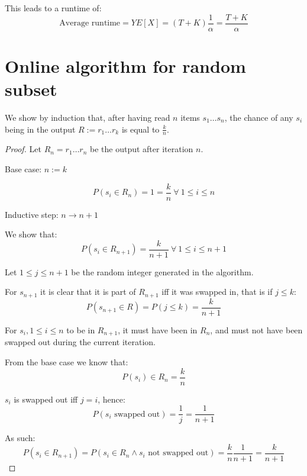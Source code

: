 \documentclass[a4paper]{scrreprt}
\begin{document}
This leads to a runtime of:
\[
  \text{Average runtime} = Y E[X] = (T + K) \frac{1}{\alpha} = \frac{T + K}{\alpha}
\]

\section{Online algorithm for random subset}

We show by induction that, after having read $n$ items $s_1 \ldots s_n$, the
chance of any $s_i$ being in the output $R := r_1 \ldots r_k$ is equal to
$\frac{k}{n}$.

\begin{proof}

  Let $R_n = r_1 \ldots r_n$ be the output after iteration $n$.

  Base case: $n := k$

  \[
    P(s_i \in R_n) = 1 = \frac{k}{n}\ \forall\ 1 \leq i \leq n
  \]

  Inductive step: $n \rightarrow n + 1$

  We show that:
  \[
    P(s_i \in R_{n+1}) = \frac{k}{n+1}\ \forall\ 1 \leq i \leq n+1
  \]

  Let $1 \leq j \leq n+1$ be the random integer generated in the algorithm.

  For $s_{n+1}$ it is clear that it is part of $R_{n+1}$ iff it was swapped in,
  that is if $j \leq k$:
  \[
    P(s_{n+1} \in R) = P(j \leq k) = \frac{k}{n+1}
  \]

  For $s_i, 1 \leq i \leq n$ to be in $R_{n+1}$, it must have been in $R_{n}$,
  and must not have been swapped out during the current iteration.

  From the base case we know that:
  \[
    P(s_i) \in R_n = \frac{k}{n}
  \]

  $s_i$ is swapped out iff $j = i$, hence:
  \[
    P(s_i \text{ swapped out}) = \frac{1}{j} = \frac{1}{n+1}
  \]

  As such:
  \[
    P(s_i \in R_{n+1}) = P(s_i \in R_n \land s_i \text{ not swapped out}) = \frac{k}{n} \frac{1}{n+1} = \frac{k}{n+1}
  \]
\end{proof}
\end{document}
